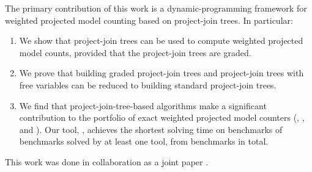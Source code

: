 The primary contribution of this work is a dynamic-programming framework for weighted projected model counting based on project-join trees. In particular:
\begin{enumerate}
    \item We show that project-join trees can be used to compute weighted projected model counts, provided that the project-join trees are graded.
    \item We prove that building graded project-join trees and project-join trees with free variables can be reduced to building standard project-join trees.
    \item We find that project-join-tree-based algorithms make a significant contribution to the portfolio of exact weighted projected model counters (\dfp{}, \projmc{}, and \ssat{}).
    Our tool, \procount{}, achieves the shortest solving time on \dpmcFastestBenchmarks{} benchmarks of \solvedBenchmarks{} benchmarks solved by at least one tool, from \benchmarks{} benchmarks in total.
\end{enumerate}

This work was done in collaboration as a joint paper \cite{dudek2020procount}.
